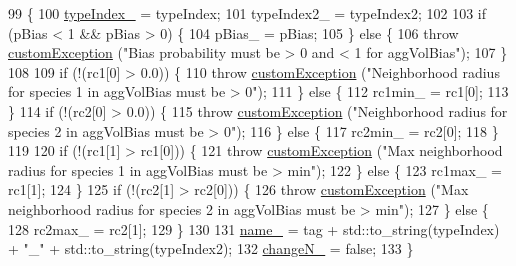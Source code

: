 \begin{DoxyCode}
99                                                                                                            
                                                                       \{
100     \hyperlink{classmc_move_acb731965547b0326ef318ec96da8b46a}{typeIndex\_} = typeIndex;
101     typeIndex2\_ = typeIndex2;
102 
103     \textcolor{keywordflow}{if} (pBias < 1 && pBias > 0) \{
104         pBias\_ = pBias;
105     \} \textcolor{keywordflow}{else} \{
106         \textcolor{keywordflow}{throw} \hyperlink{classcustom_exception}{customException} (\textcolor{stringliteral}{"Bias probability must be > 0 and < 1 for aggVolBias"});
107     \}
108 
109     \textcolor{keywordflow}{if} (!(rc1[0] > 0.0)) \{
110             \textcolor{keywordflow}{throw} \hyperlink{classcustom_exception}{customException} (\textcolor{stringliteral}{"Neighborhood radius for species 1 in aggVolBias must be
       > 0"});
111         \} \textcolor{keywordflow}{else} \{
112             rc1min\_ = rc1[0];
113         \}
114         \textcolor{keywordflow}{if} (!(rc2[0] > 0.0)) \{
115             \textcolor{keywordflow}{throw} \hyperlink{classcustom_exception}{customException} (\textcolor{stringliteral}{"Neighborhood radius for species 2 in aggVolBias must be
       > 0"});
116         \} \textcolor{keywordflow}{else} \{
117             rc2min\_ = rc2[0];
118         \}
119 
120     \textcolor{keywordflow}{if} (!(rc1[1] > rc1[0])) \{
121                 \textcolor{keywordflow}{throw} \hyperlink{classcustom_exception}{customException} (\textcolor{stringliteral}{"Max neighborhood radius for species 1 in aggVolBias
       must be > min"});
122         \} \textcolor{keywordflow}{else} \{
123                 rc1max\_ = rc1[1];
124         \}
125         \textcolor{keywordflow}{if} (!(rc2[1] > rc2[0])) \{
126                 \textcolor{keywordflow}{throw} \hyperlink{classcustom_exception}{customException} (\textcolor{stringliteral}{"Max neighborhood radius for species 2 in aggVolBias
       must be > min"});
127         \} \textcolor{keywordflow}{else} \{
128                 rc2max\_ = rc2[1];
129         \}
130 
131         \hyperlink{classmc_move_ac18c307855e1cb5751bd6e079857a8c5}{name\_} = tag + std::to\_string(typeIndex) + \textcolor{stringliteral}{"\_"} + std::to\_string(typeIndex2);
132     \hyperlink{classmc_move_add8d6d08be181274a61c7463159ad929}{changeN\_} = \textcolor{keyword}{false};
133 \}
\end{DoxyCode}


